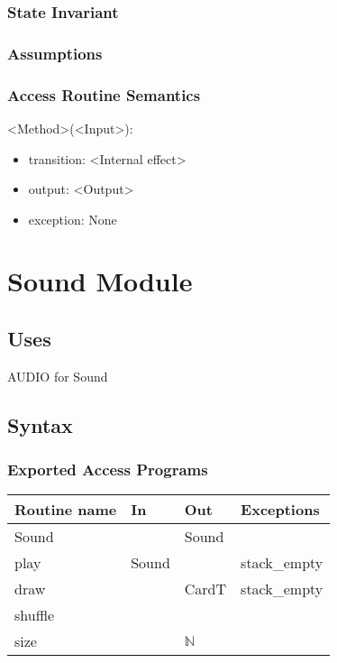 \documentclass[12pt]{article}
\begin{document}
\subsubsection*{State Invariant}

\subsubsection*{Assumptions}

\begin{itemize}
\end{itemize}

\subsubsection*{Access Routine Semantics}

<Method>(<Input>):
\begin{itemize}
    \item transition: <Internal effect>
    \item output: <Output>
    \item exception: None
\end{itemize}


\newpage %

\newpage

\section*{Sound Module}

\subsection*{Uses}

AUDIO for Sound\\

\subsection*{Syntax}

\subsubsection*{Exported Access Programs}

\begin{tabular}{| l | l | l | l |}
    \hline
    \textbf{Routine name} & \textbf{In} & \textbf{Out} & \textbf{Exceptions}\\
    \hline
    Sound & ~ & Sound & ~\\
    \hline
    play & Sound & ~ & stack\_empty\\
    \hline
    draw & ~ & CardT & stack\_empty\\
    \hline
    shuffle & ~ & ~ & ~\\
    \hline
    size & & $\mathbb{N}$ & ~\\
    \hline
\end{tabular}
\end{document}
